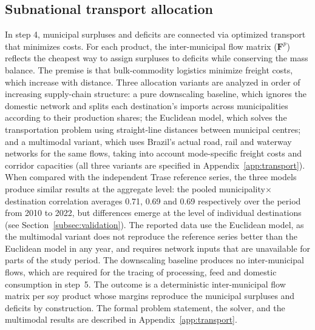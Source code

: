 \documentclass[pdflatex,sn-nature]{sn-jnl}%
\begin{document}
\subsection{Subnational transport allocation}\label{subsec:transport}
In step 4, municipal surpluses and deficits are connected via optimized
transport that minimizes costs. For each product, the inter-municipal flow
matrix ($\mathbf{F}^p$) reflects the cheapest way to assign surpluses to deficits
while conserving the mass balance. The premise is that bulk-commodity logistics
minimize freight costs, which increase with distance. Three allocation
variants are analyzed in order of increasing supply-chain structure: a
pure downscaling baseline, which ignores the domestic network and
splits each destination's imports across municipalities according to their
production shares; the Euclidean model, which solves the
transportation problem using straight-line distances between municipal
centres; and a multimodal variant, which uses Brazil's actual road,
rail and waterway networks for the same flows, taking into account
mode-specific freight costs and corridor capacities (all three variants
are specified in Appendix~\ref{app:transport}). When compared with the
independent Trase reference series, the three models produce similar results at
the aggregate level: the pooled municipality$\times$destination
correlation averages 0.71, 0.69 and 0.69 respectively over the period from
2010 to 2022, but differences emerge at the level of individual
destinations (see Section~\ref{subsec:validation}). The reported data
use the Euclidean model, as the multimodal variant does not reproduce the
reference series better than the Euclidean model in any year, and requires
network inputs that are unavailable for parts of the study period. The
downscaling baseline produces no inter-municipal flows, which are required
for the tracing of processing, feed and domestic consumption in step~5.
The outcome is a deterministic inter-municipal flow
matrix per soy product whose margins reproduce the municipal surpluses and
deficits by construction. The formal problem statement, the solver, and
the multimodal results are described in Appendix~\ref{app:transport}.

\end{document}
